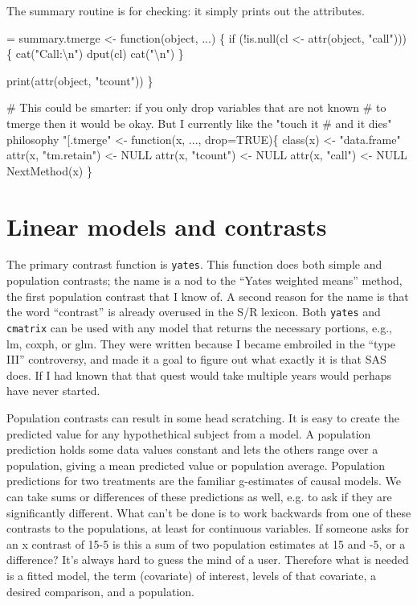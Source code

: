 \documentclass{article}
\newcommand{\code}[1]{\texttt{#1}}
\begin{document}
The summary routine is for checking: it simply prints out the attributes.
\begin{nwchunk}
=
 summary.tmerge <- function(object, ...) \{
     if (!is.null(cl <- attr(object, "call"))) \{
         cat("Call:{\textbackslash}n")
         dput(cl)
         cat("{\textbackslash}n")
     \}
 
     print(attr(object, "tcount"))
 \}
 
 # This could be smarter: if you only drop variables that are not known 
 # to tmerge then it would be okay.  But I currently like the "touch it
 #  and it dies" philosophy
 "[.tmerge" <- function(x, ..., drop=TRUE)\{
     class(x) <- "data.frame"
     attr(x, "tm.retain") <- NULL
     attr(x, "tcount") <- NULL
     attr(x, "call") <- NULL
     NextMethod(x)
     \}
\end{nwchunk}
\section{Linear models and contrasts}
The primary contrast function is \code{yates}.  
This function does both simple and population contrasts; the name is a nod
to the ``Yates weighted means'' method, the first population contrast that
I know of.  
A second reason for the name is that
the word ``contrast'' is already overused in the S/R lexicon.
Both \code{yates}  and \code{cmatrix} can be used with any model that returns 
the necessary
portions, e.g., lm, coxph, or glm.
They were written because I became embroiled in the ``type III'' controversy,
and made it a goal to figure out what exactly it is that SAS does. 
If I had known that that quest would take multiple years would 
perhaps have never started.

Population contrasts can result in some head scratching.
It is easy to create the predicted value for any hypothethical
subject from a model.  
A population prediction holds some data values constant and lets the
others range over a population, giving a mean predicted value or
population average.  
Population predictions for two treatments are the familiar g-estimates
of causal models. 
We can take sums or differences of these predictions as well, e.g. to
ask if they are significantly different.
What can't be done is to work backwards from one of these contrasts to the
populations, at least for continuous variables.
If someone asks for an x contrast of 15-5 is this a sum of two population
estimates at 15 and -5, or a difference?  
It's always hard to guess the mind of a user.
Therefore what is needed is a fitted model, the term (covariate) of interest,
levels of that covariate, a desired comparison, and a population.
\end{document}
